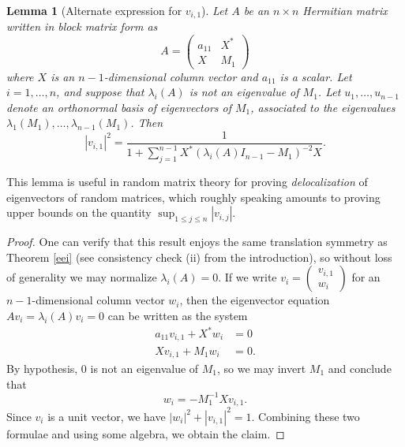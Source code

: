 \documentclass{amsart}
\newtheorem{lemma}{Lemma}
\begin{document}
\begin{lemma}[Alternate expression for $v_{i,1}$]\label{vn}  Let $A$ be an $n \times n$ Hermitian matrix written in block matrix form as
$$ A = \begin{pmatrix} a_{11} & X^* \\ X & M_1 \end{pmatrix}$$
where $X$ is an $n-1$-dimensional column vector and $a_{11}$ is a scalar.  Let $i=1,\dots,n$, and suppose that $\lambda_i(A)$ is not an eigenvalue of $M_1$.  Let $u_1,\dots,u_{n-1}$ denote an orthonormal basis of eigenvectors of $M_1$, associated to the eigenvalues $\lambda_1(M_1),\dots,\lambda_{n-1}(M_1)$.  Then
\begin{equation}\label{wts-3}
 |v_{i,1}|^2 = \frac{1}{1 + \sum_{j=1}^{n-1} X^* (\lambda_i(A) I_{n-1} - M_1)^{-2} X}.
\end{equation}
\end{lemma}

This lemma is useful in random matrix theory for proving \emph{delocalization} of eigenvectors of random matrices, which roughly speaking amounts to proving upper bounds on the quantity $\sup_{1 \leq j \leq n} |v_{i,j}|$.

\begin{proof} One can verify that this result enjoys the same translation symmetry as Theorem \ref{eei} (see consistency check (ii) from the introduction), so without loss of generality we may normalize $\lambda_i(A) = 0$.  If we write $v_i = \begin{pmatrix} v_{i,1} \\ w_i \end{pmatrix}$ for an $n-1$-dimensional column vector $w_i$, then the eigenvector equation $A v_i = \lambda_i(A) v_i = 0$ can be written as the system
\begin{align*}
a_{11} v_{i,1} + X^* w_i &= 0 \\
X v_{i,1} + M_1 w_i &= 0.
\end{align*}
By hypothesis, $0$ is not an eigenvalue of $M_1$, so we may invert $M_1$ and conclude that
$$ w_i = - M_1^{-1} X v_{i,1}.$$
Since $v_i$ is a unit vector, we have $|w_i|^2 + |v_{i,1}|^2 = 1$.  Combining these two formulae and using some algebra, we obtain the claim.
\end{proof}
\end{document}
